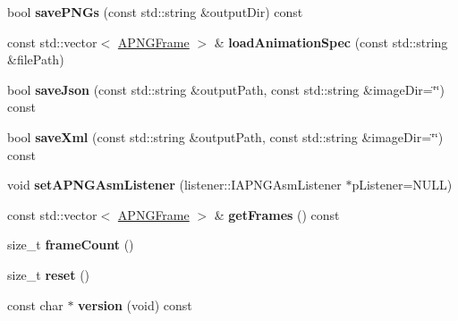 \begin{DoxyCompactItemize}
\item 
\hypertarget{classapngasm_1_1APNGAsm_a59ebac9f6db6973bc8e5b5d05e72586f}{bool {\bfseries save\-P\-N\-Gs} (const std\-::string \&output\-Dir) const }\label{classapngasm_1_1APNGAsm_a59ebac9f6db6973bc8e5b5d05e72586f}

\item 
\hypertarget{classapngasm_1_1APNGAsm_acf09916f78025c714a205142cdae1349}{const std\-::vector$<$ \hyperlink{classapngasm_1_1APNGFrame}{A\-P\-N\-G\-Frame} $>$ \& {\bfseries load\-Animation\-Spec} (const std\-::string \&file\-Path)}\label{classapngasm_1_1APNGAsm_acf09916f78025c714a205142cdae1349}

\item 
\hypertarget{classapngasm_1_1APNGAsm_ae85225d19784fe0681ab88b9220901ab}{bool {\bfseries save\-Json} (const std\-::string \&output\-Path, const std\-::string \&image\-Dir=\char`\"{}\char`\"{}) const }\label{classapngasm_1_1APNGAsm_ae85225d19784fe0681ab88b9220901ab}

\item 
\hypertarget{classapngasm_1_1APNGAsm_ae92bb6d35d573b8609cd06b80c92cc34}{bool {\bfseries save\-Xml} (const std\-::string \&output\-Path, const std\-::string \&image\-Dir=\char`\"{}\char`\"{}) const }\label{classapngasm_1_1APNGAsm_ae92bb6d35d573b8609cd06b80c92cc34}

\item 
\hypertarget{classapngasm_1_1APNGAsm_a9077ec06f0f271d1719e868b93a3a703}{void {\bfseries set\-A\-P\-N\-G\-Asm\-Listener} (listener\-::\-I\-A\-P\-N\-G\-Asm\-Listener $\ast$p\-Listener=N\-U\-L\-L)}\label{classapngasm_1_1APNGAsm_a9077ec06f0f271d1719e868b93a3a703}

\item 
\hypertarget{classapngasm_1_1APNGAsm_a7533862bb9fae0c1fe9c16d3887eb5a2}{const std\-::vector$<$ \hyperlink{classapngasm_1_1APNGFrame}{A\-P\-N\-G\-Frame} $>$ \& {\bfseries get\-Frames} () const }\label{classapngasm_1_1APNGAsm_a7533862bb9fae0c1fe9c16d3887eb5a2}

\item 
\hypertarget{classapngasm_1_1APNGAsm_aa8386d242540399c9c48cef6841feae3}{size\-\_\-t {\bfseries frame\-Count} ()}\label{classapngasm_1_1APNGAsm_aa8386d242540399c9c48cef6841feae3}

\item 
\hypertarget{classapngasm_1_1APNGAsm_a01763c8cd76b6ed61309b50cf1060e03}{size\-\_\-t {\bfseries reset} ()}\label{classapngasm_1_1APNGAsm_a01763c8cd76b6ed61309b50cf1060e03}

\item 
\hypertarget{classapngasm_1_1APNGAsm_ac021e490af5e73353d1efbc5c1216637}{const char $\ast$ {\bfseries version} (void) const }\label{classapngasm_1_1APNGAsm_ac021e490af5e73353d1efbc5c1216637}

\end{DoxyCompactItemize}
